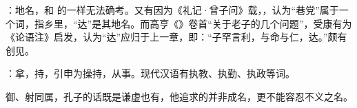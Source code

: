 {
\begin{lyblobitemize}
\item {}：地名，和  的一样无法确考。又有因为《礼记·曾子问》载，，认为“巷党”属于一个词，指乡里，“达”是其地名。而高亨《》卷首“关于老子的几个问题”，受康有为《论语注》启发，认为“达”应归于上一章，即：“子罕言利，与命与仁，达。”颇有创见。

\item {}：拿，持，引申为操持，从事。现代汉语有执教、执勤、执政等词。
\end{lyblobitemize}
御、射同属，孔子的话既是谦虚也有，他追求的并非成名，更不能容忍不义之名。
}
{}


